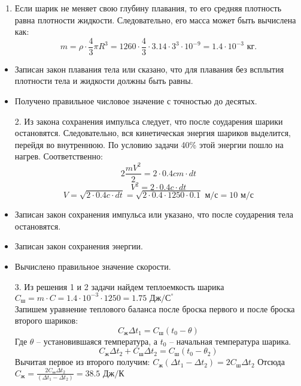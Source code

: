 \solutionSection

\begin{enumerate}
\item Если шарик не меняет свою глубину плавания, то его средняя плотность равна плотности жидкости. Следовательно, его масса может быть вычислена как:
$$m=\rho\cdot\frac{4}{3}\pi R^3=1260\cdot\frac{4}{3}\cdot3.14\cdot3^3\cdot10^{-9}=1.4\cdot10^{-3}\text{ кг.}$$
\end{enumerate}

\markSection

\begin{itemize}
\item Записан закон плавания тела или сказано, что для плавания без всплытия плотности тела и жидкости должны быть равны.
\item Получено правильное числовое значение с точностью до десятых.
\end{itemize}

\begin{enumerate}
\item [2.] Из закона сохранения импульса следует, что после соударения шарики остановятся. Следовательно, вся кинетическая энергия шариков выделится, перейдя во внутреннюю. По условию задачи 40\% этой энергии пошло на нагрев. Соответственно:
$$2\frac{mV^2}{2}=2\cdot0.4cm\cdot dt$$
$$V^2=2\cdot0.4c\cdot dt$$
$$V=\sqrt{2\cdot0.4c\cdot dt}=\sqrt{2\cdot0.4\cdot1250\cdot0.1}\text{ м/с}=10\text{ м/с}$$
\end{enumerate}

\markSection

\begin{itemize}
\item Записан закон сохранения импульса или указано, что после соударения тела остановятся.
\item Записан закон сохранения энергии.
\item Вычислено правильное значение скорости.
\end{itemize}
\begin{enumerate}
\item [3.] Из решения 1 и 2 задачи найдем теплоемкость шарика $C_\text{ш}=m\cdot C=1.4\cdot10^{-3}\cdot1250=1.75\text{ Дж/С}^{\circ}$\\
Запишем уравнение теплового баланса после броска первого и после броска второго шариков:
$$C_\text{ж}\Delta t_1=C_\text{ш}(t_0-\theta)$$
Где $\theta$ – установившаяся температура, а $t_0$ – начальная температура шарика.
$$C_\text{ж}\Delta t_2+C_\text{ш}\Delta t_2=C_\text{ш}(t_0-\theta_2 )$$
Вычитая первое из второго получим: $C_\text{ж}(\Delta t_1-\Delta t_2 )=2C_\text{ш}\Delta t_2$
Отсюда $C_\text{ж}=\frac{2C_\text{ш}\Delta t_2}{(\Delta t_1-\Delta t_2)}=38.5\text{ Дж/К}$\\
\end{enumerate}

